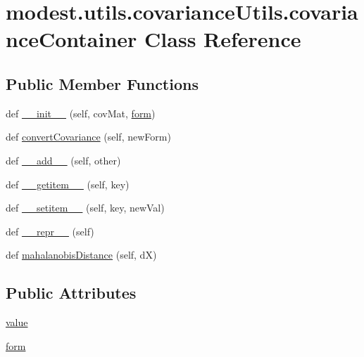 \hypertarget{classmodest_1_1utils_1_1covarianceUtils_1_1covarianceContainer}{}\section{modest.\+utils.\+covariance\+Utils.\+covariance\+Container Class Reference}
\label{classmodest_1_1utils_1_1covarianceUtils_1_1covarianceContainer}
\subsection*{Public Member Functions}
\begin{DoxyCompactItemize}
\item 
def \hyperlink{classmodest_1_1utils_1_1covarianceUtils_1_1covarianceContainer_aa1979c01cad0f39e79ffc78f4e2bfa2a}{\+\_\+\+\_\+init\+\_\+\+\_\+} (self, cov\+Mat, \hyperlink{classmodest_1_1utils_1_1covarianceUtils_1_1covarianceContainer_aff87f133296f048ecbffb6de78c5cf81}{form})
\item 
def \hyperlink{classmodest_1_1utils_1_1covarianceUtils_1_1covarianceContainer_aaf4830f57a00feb6a49c2e1b772c3119}{convert\+Covariance} (self, new\+Form)
\item 
def \hyperlink{classmodest_1_1utils_1_1covarianceUtils_1_1covarianceContainer_a1c067b518b040c5e5ad42f2237727af0}{\+\_\+\+\_\+add\+\_\+\+\_\+} (self, other)
\item 
def \hyperlink{classmodest_1_1utils_1_1covarianceUtils_1_1covarianceContainer_a56951c337c92251cedf74c92cc5c7be2}{\+\_\+\+\_\+getitem\+\_\+\+\_\+} (self, key)
\item 
def \hyperlink{classmodest_1_1utils_1_1covarianceUtils_1_1covarianceContainer_a4dd3d1dd01411e1d7fa6fe16b6440ac0}{\+\_\+\+\_\+setitem\+\_\+\+\_\+} (self, key, new\+Val)
\item 
def \hyperlink{classmodest_1_1utils_1_1covarianceUtils_1_1covarianceContainer_aa81e2cb9af095cb7373c4b8d93fabccd}{\+\_\+\+\_\+repr\+\_\+\+\_\+} (self)
\item 
def \hyperlink{classmodest_1_1utils_1_1covarianceUtils_1_1covarianceContainer_a38becff5ec0b60d93b023baf2aa8bcd7}{mahalanobis\+Distance} (self, dX)
\end{DoxyCompactItemize}
\subsection*{Public Attributes}
\begin{DoxyCompactItemize}
\item 
\hyperlink{classmodest_1_1utils_1_1covarianceUtils_1_1covarianceContainer_abe099ec2109ec206be8f327a13bf700b}{value}
\item 
\hyperlink{classmodest_1_1utils_1_1covarianceUtils_1_1covarianceContainer_aff87f133296f048ecbffb6de78c5cf81}{form}
\end{DoxyCompactItemize}
